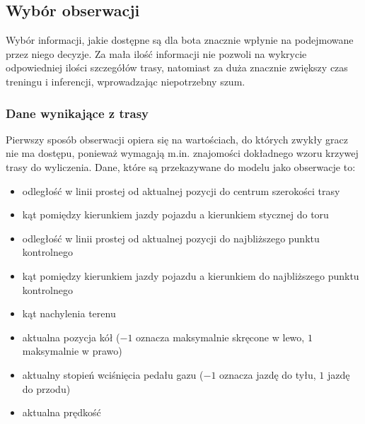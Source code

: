 \subsection{Wybór obserwacji}
Wybór informacji, jakie dostępne są dla bota znacznie wpłynie na podejmowane przez niego decyzje. Za mała ilość informacji nie pozwoli na wykrycie odpowiedniej ilości szczegółów trasy, natomiast za duża znacznie zwiększy czas treningu i inferencji, wprowadzając niepotrzebny szum.

\subsubsection{Dane wynikające z trasy}
Pierwszy sposób obserwacji opiera się na wartościach, do których zwykły gracz nie ma dostępu, ponieważ wymagają m.in. znajomości dokładnego wzoru  krzywej trasy do wyliczenia. Dane, które są przekazywane do modelu jako obserwacje to:
\begin{itemize}
    \item odległość w linii prostej od aktualnej pozycji do centrum szerokości trasy
    \item kąt pomiędzy kierunkiem jazdy pojazdu a kierunkiem stycznej do toru
    \item odległość w linii prostej od aktualnej pozycji do najbliższego punktu kontrolnego
    \item kąt pomiędzy kierunkiem jazdy pojazdu a kierunkiem do najbliższego punktu kontrolnego
    \item kąt nachylenia terenu
    \item aktualna pozycja kół ($-1$ oznacza maksymalnie skręcone w lewo, $1$ maksymalnie w prawo)
    \item aktualny stopień wciśnięcia pedału gazu ($-1$ oznacza jazdę do tyłu, $1$ jazdę do przodu)
    \item aktualna prędkość
\end{itemize}

